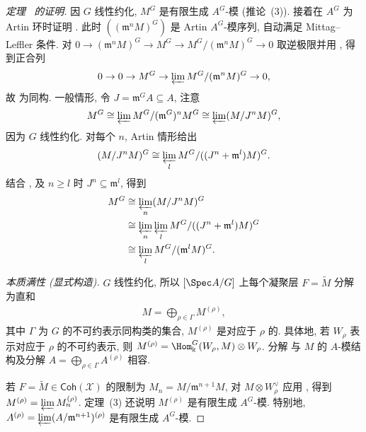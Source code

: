 \begin{proof}[定理~ 的证明]
因 $G$ 线性约化, $M^G$ 是有限生成 $A^G$-模 (推论~(3)). 接着在 $A^G$ 为 Artin 环时证明 . 此时 $((\mathfrak m^nM)^G)$ 是 Artin $A^G$-模序列, 自动满足 Mittag--Leffler 条件. 对 $0\to(\mathfrak m^nM)^G\to M^G\to M^G/(\mathfrak m^nM)^G\to0$ 取逆极限并用 , 得到正合列
\begin{align*}
0\to0\to M^G\to\varprojlim M^G/(\mathfrak m^nM)^G\to0,
\end{align*}
故  为同构. 一般情形, 令 $J=\mathfrak m^GA\subseteq A$, 注意
\begin{align}\label{src:7.6.19}
M^G\cong\varprojlim M^G/(\mathfrak m^G)^nM^G\cong\varprojlim(M/J^nM)^G,
\end{align}
因为 $G$ 线性约化. 对每个 $n$, Artin 情形给出
\begin{align}\label{src:7.6.20}
(M/J^nM)^G\cong\varprojlim_l M^G/((J^n+\mathfrak m^l)M)^G.
\end{align}
结合 ,  及 $n\ge l$ 时 $J^n\subseteq\mathfrak m^l$, 得到
\begin{align*}
M^G&\cong\varprojlim_n(M/J^nM)^G\\
&\cong\varprojlim_n\varprojlim_l M^G/((J^n+\mathfrak m^l)M)^G\\
&\cong\varprojlim_l M^G/(\mathfrak m^lM)^G.
\end{align*}

\emph{本质满性 (显式构造).} $G$ 线性约化, 所以 $[\Spec A/G]$ 上每个凝聚层 $F=\widetilde M$ 分解为直和
\begin{align}\label{src:7.6.21}
M=\bigoplus_{\rho\in\Gamma}M^{(\rho)},
\end{align}
其中 $\Gamma$ 为 $G$ 的不可约表示同构类的集合, $M^{(\rho)}$ 是对应于 $\rho$ 的. 具体地, 若 $W_\rho$ 表示对应于 $\rho$ 的不可约表示, 则 $M^{(\rho)}=\Hom_{\Bbbk}^G(W_\rho,M)\otimes W_\rho$. 分解  与 $M$ 的 $A$-模结构及分解 $A=\bigoplus_{\rho\in\Gamma}A^{(\rho)}$ 相容.

若 $F=\widetilde M\in\mathsf{Coh}(\mathcal X)$ 的限制为 $M_n=M/\mathfrak m^{n+1}M$, 对 $M\otimes W_\rho^\vee$ 应用 , 得到 $M^{(\rho)}=\varprojlim M_n^{(\rho)}$. 定理~(3) 还说明 $M^{(\rho)}$ 是有限生成 $A^G$-模. 特别地, $A^{(\rho)}=\varprojlim(A/\mathfrak m^{n+1})^{(\rho)}$ 是有限生成 $A^G$-模.


\end{proof}
